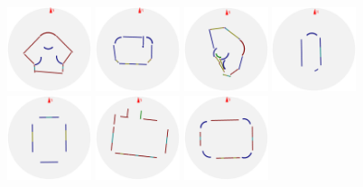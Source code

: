 \begin{figure}[t]
  \includegraphics[width=0.97in]{../gi2012_userstudy/images/section4/3_2D_walls_rotate} %
  \includegraphics[width=0.97in]{../gi2012_userstudy/images/section4/4_2D_walls_rotate} %
  \includegraphics[width=0.97in]{../gi2012_userstudy/images/section4/6_2D_walls_rotate} %
  \includegraphics[width=0.97in]{../gi2012_userstudy/images/section4/7_2D_walls_rotate} %
  \includegraphics[width=0.97in]{../gi2012_userstudy/images/section4/10_2D_walls_rotate} %
  \includegraphics[width=0.97in]{../gi2012_userstudy/images/section4/11_2D_walls_rotate} %
  \includegraphics[width=0.97in]{../gi2012_userstudy/images/section4/12_2D_walls_rotate} %

\end{figure}

